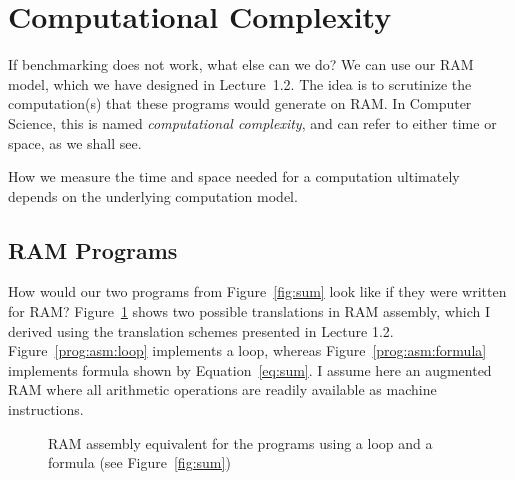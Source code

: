 \documentclass{aldast}
\begin{document}
\section{Computational Complexity}

If benchmarking does not work, what else can we do? We can use our RAM
model, which we have designed in Lecture~1.2. The idea is to
scrutinize the computation(s) that these programs would generate on
RAM. In Computer Science, this is named \emph{computational
  complexity}, and can refer to
either time or space, as we shall see.

\begin{takeaway}
  How we measure the time and space needed for a computation
  ultimately depends on the underlying computation model.
\end{takeaway}

\subsection{RAM Programs}

How would our two programs from Figure~\ref{fig:sum} look like if they
were written for RAM? Figure~\ref{fig:asm} shows two possible
translations in RAM assembly, which I derived using the translation
schemes presented in Lecture 1.2. Figure~\ref{prog:asm:loop}
implements a loop, whereas Figure~\ref{prog:asm:formula} implements
formula shown by Equation~\ref{eq:sum}. I assume here an augmented RAM
where all arithmetic operations are readily available as machine
instructions.

\begin{figure}
  \hfill
  \caption{RAM assembly equivalent for the programs using a loop and a formula (see Figure~\ref{fig:sum})}
  \label{fig:asm}
\end{figure}
\end{document}

